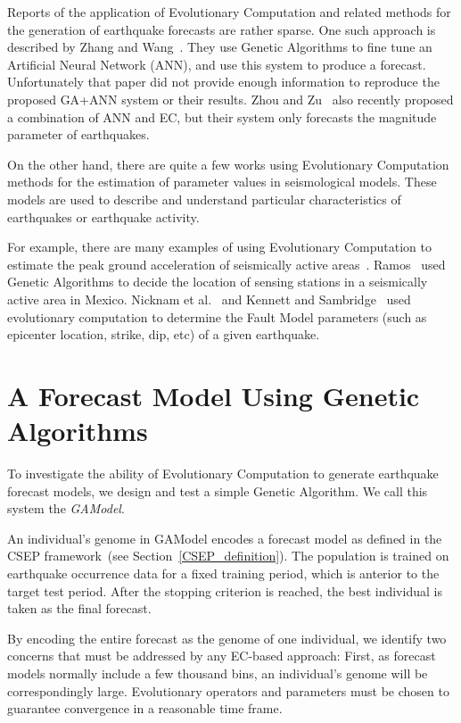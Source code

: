 \documentclass[a4paper,twoside]{article}
\begin{document}
Reports of the application of Evolutionary Computation and related
methods for the generation of earthquake forecasts are rather sparse.
One such approach is described by Zhang and
Wang~\cite{Zhang2012}. They use Genetic Algorithms to fine tune an
Artificial Neural Network (ANN), and use this system to produce a
forecast. Unfortunately that paper did not provide enough information
to reproduce the proposed GA+ANN system or their results. Zhou and
Zu~\cite{Feiyan2014} also recently proposed a combination of ANN and
EC, but their system only forecasts the magnitude parameter of
earthquakes.

On the other hand, there are quite a few works using Evolutionary
Computation methods for the estimation of parameter values in
seismological models. These models are used to describe and understand
particular characteristics of earthquakes or earthquake activity.

For example, there are many examples of using Evolutionary Computation
to estimate the peak ground acceleration of seismically active
areas~\cite{Kermani2009,Cabalar2009,Kerh2010}. Ramos~\cite{Ramos2011}
used Genetic Algorithms to decide the location of sensing stations in
a seismically active area in Mexico. Nicknam et al.~\cite{Nicknam2010}
and Kennett and Sambridge~\cite{Kennett1992} used evolutionary
computation to determine the Fault Model parameters (such as epicenter
location, strike, dip, etc) of a given earthquake.

\section{A Forecast Model Using Genetic Algorithms}\label{implementation}

To investigate the ability of Evolutionary Computation to generate
earthquake forecast models, we design and test a simple Genetic
Algorithm. We call this system the \emph{GAModel}.

An individual's genome in GAModel encodes a forecast model as defined
in the CSEP framework~(see Section~\ref{CSEP_definition}). The
population is trained on earthquake occurrence data for a fixed
training period, which is anterior to the target test period. After
the stopping criterion is reached, the best individual is taken as the
final forecast.

By encoding the entire forecast as the genome of one individual, we
identify two concerns that must be addressed by any EC-based
approach: First, as forecast models normally include a few thousand
bins, an individual's genome will be correspondingly
large. Evolutionary operators and parameters must be chosen to
guarantee convergence in a reasonable time frame.
\end{document}
